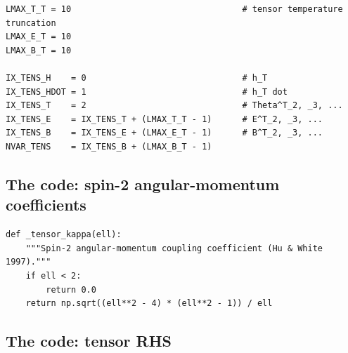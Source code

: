 \begin{codebox}
\begin{lstlisting}[style=python]
LMAX_T_T = 10                                  # tensor temperature truncation
LMAX_E_T = 10
LMAX_B_T = 10

IX_TENS_H    = 0                               # h_T
IX_TENS_HDOT = 1                               # h_T dot
IX_TENS_T    = 2                               # Theta^T_2, _3, ...
IX_TENS_E    = IX_TENS_T + (LMAX_T_T - 1)      # E^T_2, _3, ...
IX_TENS_B    = IX_TENS_E + (LMAX_E_T - 1)      # B^T_2, _3, ...
NVAR_TENS    = IX_TENS_B + (LMAX_B_T - 1)
\end{lstlisting}
\end{codebox}

\subsection{The code: spin-2 angular-momentum coefficients}

\begin{codebox}
\begin{lstlisting}[style=python]
def _tensor_kappa(ell):
    """Spin-2 angular-momentum coupling coefficient (Hu & White 1997)."""
    if ell < 2:
        return 0.0
    return np.sqrt((ell**2 - 4) * (ell**2 - 1)) / ell
\end{lstlisting}
\end{codebox}

\subsection{The code: tensor RHS}

